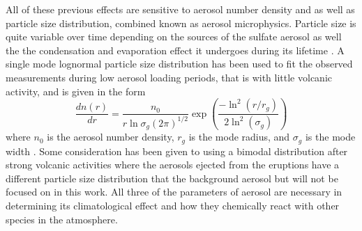 All of these previous effects are sensitive to aerosol number density and as well as particle size distribution, combined known as aerosol microphysics. Particle size is quite variable over time depending on the sources of the sulfate aerosol as well the the condensation and evaporation effect it undergoes during its lifetime \citep{Bingen2004}. A single mode lognormal particle size distribution has been used to fit the observed measurements during low aerosol loading periods, that is with little volcanic activity, and is given in the form
\begin{equation}
\label{eq:AerosolParticleSizeDistrabution}
\frac{dn(r)}{dr}=\frac{n_{0}}{r\ln\sigma_{g}(2\pi)^{1/2}}\exp\left(\frac{-\ln^{2}(r/r_{g})}{2\ln^{2}(\sigma_{g})}\right)
\end{equation}
where $n_{0}$ is the aerosol number density, $r_{g}$ is the mode radius, and $\sigma_{g}$ is the mode width \citep{Jager1991}. Some consideration has been given to using a bimodal distribution after strong volcanic activities where the aerosols ejected from the eruptions have a different particle size distribution that the background aerosol \citep{Deshler2003} but will not be focused on in this work. All three of the parameters of aerosol are necessary in determining its climatological effect and how they chemically react with other species in the atmosphere.  